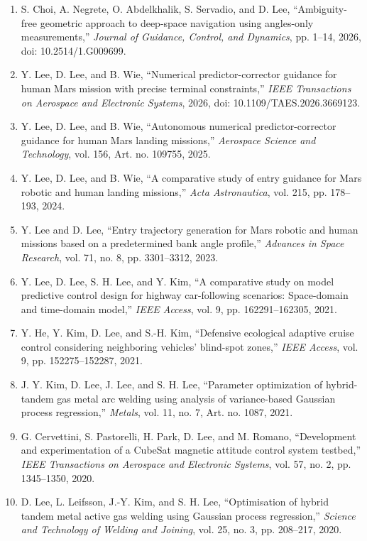 \begin{enumerate}
  \item S. Choi, A. Negrete, O. Abdelkhalik, S. Servadio, and D. Lee, ``Ambiguity-free geometric approach to deep-space navigation using angles-only measurements,'' \textit{Journal of Guidance, Control, and Dynamics}, pp. 1--14, 2026, doi: 10.2514/1.G009699.
  \item Y. Lee, D. Lee, and B. Wie, ``Numerical predictor-corrector guidance for human Mars mission with precise terminal constraints,'' \textit{IEEE Transactions on Aerospace and Electronic Systems}, 2026, doi: 10.1109/TAES.2026.3669123.
  \item Y. Lee, D. Lee, and B. Wie, ``Autonomous numerical predictor-corrector guidance for human Mars landing missions,'' \textit{Aerospace Science and Technology}, vol. 156, Art. no. 109755, 2025.
  \item Y. Lee, D. Lee, and B. Wie, ``A comparative study of entry guidance for Mars robotic and human landing missions,'' \textit{Acta Astronautica}, vol. 215, pp. 178--193, 2024.
  \item Y. Lee and D. Lee, ``Entry trajectory generation for Mars robotic and human missions based on a predetermined bank angle profile,'' \textit{Advances in Space Research}, vol. 71, no. 8, pp. 3301--3312, 2023.
  \item Y. Lee, D. Lee, S. H. Lee, and Y. Kim, ``A comparative study on model predictive control design for highway car-following scenarios: Space-domain and time-domain model,'' \textit{IEEE Access}, vol. 9, pp. 162291--162305, 2021.
  \item Y. He, Y. Kim, D. Lee, and S.-H. Kim, ``Defensive ecological adaptive cruise control considering neighboring vehicles' blind-spot zones,'' \textit{IEEE Access}, vol. 9, pp. 152275--152287, 2021.
  \item J. Y. Kim, D. Lee, J. Lee, and S. H. Lee, ``Parameter optimization of hybrid-tandem gas metal arc welding using analysis of variance-based Gaussian process regression,'' \textit{Metals}, vol. 11, no. 7, Art. no. 1087, 2021.
  \item G. Cervettini, S. Pastorelli, H. Park, D. Lee, and M. Romano, ``Development and experimentation of a CubeSat magnetic attitude control system testbed,'' \textit{IEEE Transactions on Aerospace and Electronic Systems}, vol. 57, no. 2, pp. 1345--1350, 2020.
  \item D. Lee, L. Leifsson, J.-Y. Kim, and S. H. Lee, ``Optimisation of hybrid tandem metal active gas welding using Gaussian process regression,'' \textit{Science and Technology of Welding and Joining}, vol. 25, no. 3, pp. 208--217, 2020.

\end{enumerate}
